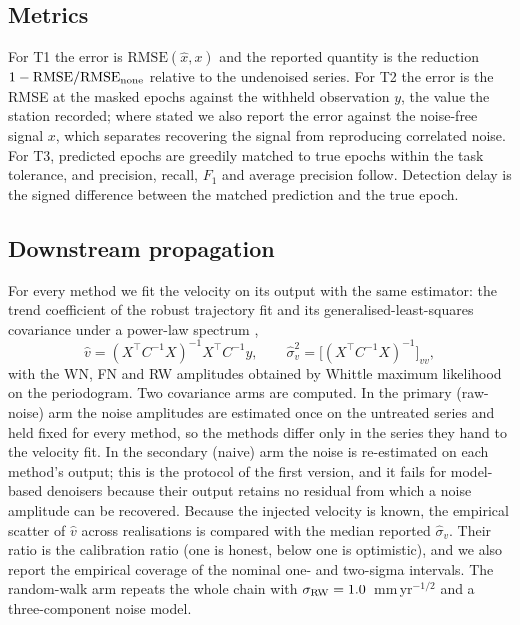 \subsection{Metrics}
\label{sec:method:metrics}

For T1 the error is $\mathrm{RMSE}(\hat{x},x)$ and the reported quantity is the
reduction $1-\mathrm{RMSE}/\mathrm{RMSE}_{\rm none}$ relative to the undenoised
series. For T2 the error is the RMSE at the masked epochs against the withheld
observation $y$, the value the station recorded; where stated we also report the
error against the noise-free signal $x$, which separates recovering the signal
from reproducing correlated noise. For T3, predicted epochs are greedily matched
to true epochs within the task tolerance, and precision, recall, $F_1$ and average
precision follow. Detection delay is the signed difference between the matched
prediction and the true epoch.

\subsection{Downstream propagation}
\label{sec:method:downstream}

For every method we fit the velocity on its output with the same estimator: the
trend coefficient of the robust trajectory fit and its generalised-least-squares
covariance under a power-law spectrum \citep{williams2008cats,bos2008fast},
\begin{equation}
\hat v=(X^\top C^{-1}X)^{-1}X^\top C^{-1}y,\qquad
\hat\sigma_v^2=\bigl[(X^\top C^{-1}X)^{-1}\bigr]_{vv},
\label{eq:downstream}
\end{equation}
with the WN, FN and RW amplitudes obtained by Whittle maximum likelihood on the
periodogram. Two covariance arms are computed. In the primary (raw-noise) arm the
noise amplitudes are estimated once on the untreated series and held fixed for
every method, so the methods differ only in the series they hand to the velocity
fit. In the secondary (naive) arm the noise is re-estimated on each method's
output; this is the protocol of the first version, and it fails for
model-based denoisers because their output retains no residual from which a
noise amplitude can be recovered. Because the injected velocity is known, the
empirical scatter of $\hat v$ across realisations is compared with the median
reported $\hat\sigma_v$. Their ratio is the calibration ratio (one is honest,
below one is optimistic), and we also report the empirical coverage of the
nominal one- and two-sigma intervals. The random-walk arm repeats the whole chain
with $\sigma_{\rm RW}=1.0$~mm\,yr$^{-1/2}$ and a three-component noise model.
